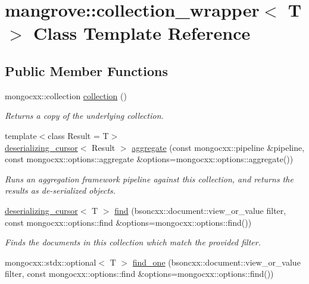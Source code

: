 \hypertarget{classmangrove_1_1collection__wrapper}{}\section{mangrove\+:\+:collection\+\_\+wrapper$<$ T $>$ Class Template Reference}
\label{classmangrove_1_1collection__wrapper}
\subsection*{Public Member Functions}
\begin{DoxyCompactItemize}
\item 
mongocxx\+::collection \hyperlink{classmangrove_1_1collection__wrapper_af08b74f61391b8bd87043f670abcbaf4}{collection} ()
\begin{DoxyCompactList}\small\item\em Returns a copy of the underlying collection. \end{DoxyCompactList}\item 
{\footnotesize template$<$class Result  = T$>$ }\\\hyperlink{classmangrove_1_1deserializing__cursor}{deserializing\+\_\+cursor}$<$ Result $>$ \hyperlink{classmangrove_1_1collection__wrapper_a955de3fd1b71d4811ed94636143fe458}{aggregate} (const mongocxx\+::pipeline \&pipeline, const mongocxx\+::options\+::aggregate \&options=mongocxx\+::options\+::aggregate())
\begin{DoxyCompactList}\small\item\em Runs an aggregation framework pipeline against this collection, and returns the results as de-\/serialized objects. \end{DoxyCompactList}\item 
\hyperlink{classmangrove_1_1deserializing__cursor}{deserializing\+\_\+cursor}$<$ T $>$ \hyperlink{classmangrove_1_1collection__wrapper_afe3946f76a44fd8079d03cf2adc013e6}{find} (bsoncxx\+::document\+::view\+\_\+or\+\_\+value filter, const mongocxx\+::options\+::find \&options=mongocxx\+::options\+::find())
\begin{DoxyCompactList}\small\item\em Finds the documents in this collection which match the provided filter. \end{DoxyCompactList}\item 
mongocxx\+::stdx\+::optional$<$ T $>$ \hyperlink{classmangrove_1_1collection__wrapper_ad3fb7047be0963418b098e204226583a}{find\+\_\+one} (bsoncxx\+::document\+::view\+\_\+or\+\_\+value filter, const mongocxx\+::options\+::find \&options=mongocxx\+::options\+::find())

\end{DoxyCompactItemize}
